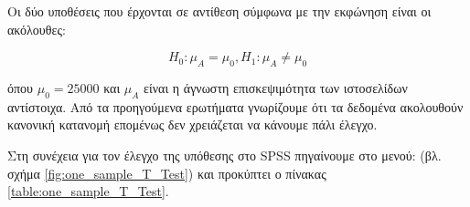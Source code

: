 \documentclass{assignment}
\begin{document}
\begin{Assignment}[Μέρος Β]

Οι δύο υποθέσεις που έρχονται σε αντίθεση σύμφωνα με την εκφώνηση είναι οι ακόλουθες:

\begin{equation}
H_0 : \mu_A = \mu_0, H_1: \mu_A \neq \mu_0
\end{equation}

όπου $ \mu_0 = 25000$ και $ \mu_A $ είναι η άγνωστη επισκεψιμότητα των ιστοσελίδων αντίστοιχα. Από τα προηγούμενα ερωτήματα γνωρίζουμε ότι τα δεδομένα ακολουθούν κανονική κατανομή επομένως δεν χρειάζεται να κάνουμε πάλι έλεγχο.

Στη συνέχεια για τον έλεγχο της υπόθεσης στο SPSS πηγαίνουμε στο μενού:  (βλ. σχήμα \ref{fig:one_sample_T_Test}) και προκύπτει ο πίνακας \ref{table:one_sample_T_Test}. 


\end{Assignment}
\end{document}
